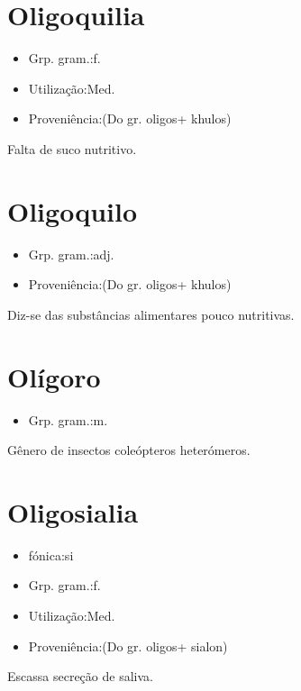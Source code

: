 \section{Oligoquilia}
\begin{itemize}
\item {Grp. gram.:f.}
\end{itemize}
\begin{itemize}
\item {Utilização:Med.}
\end{itemize}
\begin{itemize}
\item {Proveniência:(Do gr. \textunderscore oligos\textunderscore  + \textunderscore khulos\textunderscore )}
\end{itemize}
Falta de suco nutritivo.
\section{Oligoquilo}
\begin{itemize}
\item {Grp. gram.:adj.}
\end{itemize}
\begin{itemize}
\item {Proveniência:(Do gr. \textunderscore oligos\textunderscore  + \textunderscore khulos\textunderscore )}
\end{itemize}
Diz-se das substâncias alimentares pouco nutritivas.
\section{Olígoro}
\begin{itemize}
\item {Grp. gram.:m.}
\end{itemize}
Gênero de insectos coleópteros heterómeros.
\section{Oligosialia}
\begin{itemize}
\item {fónica:si}
\end{itemize}
\begin{itemize}
\item {Grp. gram.:f.}
\end{itemize}
\begin{itemize}
\item {Utilização:Med.}
\end{itemize}
\begin{itemize}
\item {Proveniência:(Do gr. \textunderscore oligos\textunderscore  + \textunderscore sialon\textunderscore )}
\end{itemize}
Escassa secreção de saliva.
